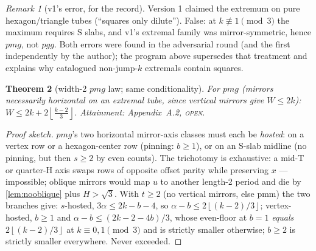 \documentclass[11pt,a4paper,oneside]{article}
\theoremstyle{plain}
\newtheorem{theorem}{Theorem}[section]
\theoremstyle{definition}
\theoremstyle{remark}
\newtheorem{remark}[theorem]{Remark}
\newcommand{\fl}[1]{\left\lfloor #1 \right\rfloor}
\newcommand{\pmgw}{2k + 2\fl{\tfrac{k-2}{3}}}
\newcommand{\statOPEN}{\textcolor{red!60!black}{\textsc{open}}}
\begin{document}
\begin{remark}[v1's error, for the record]\label{rem:v1}
Version 1 claimed the extremum on pure hexagon/triangle tubes (``squares only dilute'').
False: at $k \not\equiv 1 \pmod 3$ the maximum requires S slabs, and v1's extremal family
was mirror-symmetric, hence $pmg$, not $pgg$. Both errors were found in the adversarial
round (and the first independently by the author); the program above supersedes that
treatment and explains why catalogued non-jump-$k$ extremals contain squares.
\end{remark}

\begin{theorem}[width-2 $pmg$ law; same conditionality]\label{thm:C}
For $pmg$ (mirrors necessarily horizontal on an extremal tube, since vertical mirrors give
$W \le 2k$): $W \le \pmgw$. Attainment: Appendix~A.2, \statOPEN.
\end{theorem}
\begin{proof}[Proof sketch]
$pmg$'s two horizontal mirror-axis classes must each be \emph{hosted}: on a vertex row or a
hexagon-center row (pinning: $b \ge 1$), or on an S-slab midline (no pinning, but then
$s \ge 2$ by even counts). The trichotomy is exhaustive: a mid-T or quarter-H axis swaps
rows of opposite offset parity while preserving $x$ --- impossible; oblique mirrors would
map $u$ to another length-2 period and die by \cref{lem:nooblique} plus $H > \sqrt3$.
With $t \ge 2$ (no vertical mirrors, else pmm) the two branches give:
$s$-hosted, $3\alpha \le 2k - b - 4$, so $\alpha - b \le 2\fl{(k-2)/3}$; vertex-hosted,
$b \ge 1$ and $\alpha - b \le (2k - 2 - 4b)/3$, whose even-floor at $b = 1$ \emph{equals}
$2\fl{(k-2)/3}$ at $k \equiv 0, 1 \pmod 3$ and is strictly smaller otherwise; $b \ge 2$ is
strictly smaller everywhere. Never exceeded.
\end{proof}
\end{document}
